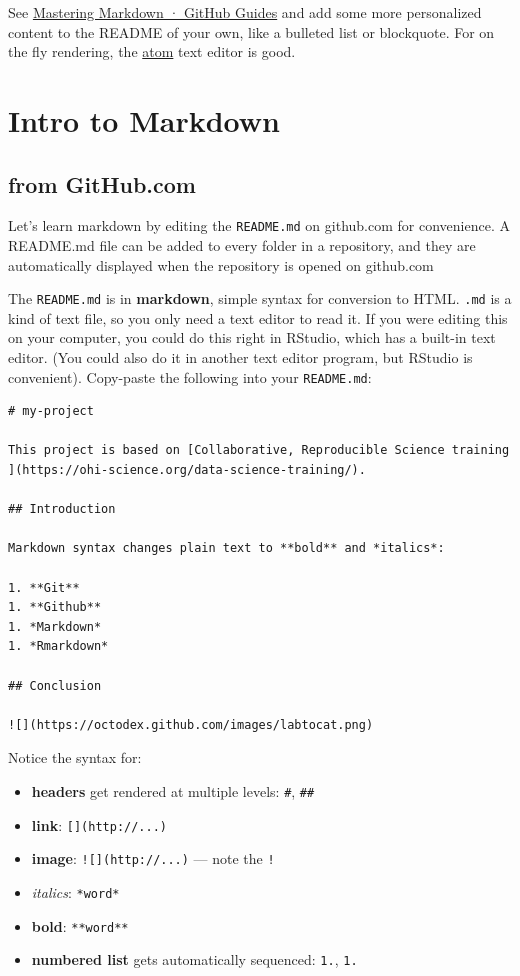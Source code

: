 \documentclass[]{book}
\providecommand{\tightlist}{%
  \setlength{\itemsep}{0pt}\setlength{\parskip}{0pt}}
\theoremstyle{definition}
\theoremstyle{definition}
\theoremstyle{definition}
\theoremstyle{remark}
\begin{document}
See
\href{https://guides.github.com/features/mastering-markdown/}{Mastering
Markdown · GitHub Guides} and add some more personalized content to the
README of your own, like a bulleted list or blockquote. For on the fly
rendering, the \href{https://atom.io/}{atom} text editor is good.

\section{Intro to Markdown}\label{intro-to-markdown}

\subsection{from GitHub.com}\label{from-github.com}

Let's learn markdown by editing the \texttt{README.md} on github.com for
convenience. A README.md file can be added to every folder in a
repository, and they are automatically displayed when the repository is
opened on github.com

The \texttt{README.md} is in \textbf{markdown}, simple syntax for
conversion to HTML. \texttt{.md} is a kind of text file, so you only
need a text editor to read it. If you were editing this on your
computer, you could do this right in RStudio, which has a built-in text
editor. (You could also do it in another text editor program, but
RStudio is convenient). Copy-paste the following into your
\texttt{README.md}:

\begin{verbatim}
# my-project

This project is based on [Collaborative, Reproducible Science training ](https://ohi-science.org/data-science-training/).

## Introduction

Markdown syntax changes plain text to **bold** and *italics*:

1. **Git**
1. **Github**
1. *Markdown*
1. *Rmarkdown*

## Conclusion

![](https://octodex.github.com/images/labtocat.png)
\end{verbatim}

Notice the syntax for:

\begin{itemize}
\tightlist
\item
  \textbf{headers} get rendered at multiple levels: \texttt{\#},
  \texttt{\#\#}
\item
  \textbf{link}: \texttt{{[}{]}(http://...)}
\item
  \textbf{image}: \texttt{!{[}{]}(http://...)} --- note the \texttt{!}
\item
  \emph{italics}: \texttt{*word*}
\item
  \textbf{bold}: \texttt{**word**}
\item
  \textbf{numbered list} gets automatically sequenced: \texttt{1.},
  \texttt{1.}
\end{itemize}
\end{document}
